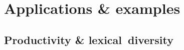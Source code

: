 \documentclass[t]{beamer} %
\begin{document}

\begin{frame}[c]
  \begin{center}
  \end{center}
\end{frame}
\hideLogo{}


\section{Applications \& examples}

\subsection{Productivity \& lexical~diversity}
\end{document}
